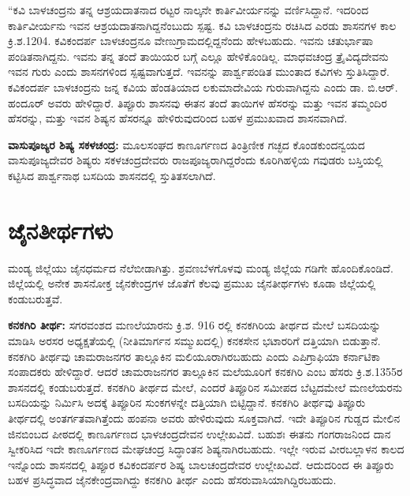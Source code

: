“ಕವಿ ಬಾಳಚಂದ್ರನು ತನ್ನ ಆಶ್ರಯದಾತನಾದ ರಟ್ಟರ ನಾಲ್ಕನೇ ಕಾರ್ತಿವೀರ್ಯನನ್ನು ವರ್ಣಿಸಿದ್ದಾನೆ. ಇದರಿಂದ ಕಾರ್ತಿವೀರ್ಯನು ಇವನ ಆಶ್ರಯದಾತನಾಗಿದ್ದನೆಂಬುದು ಸ್ಪಷ್ಟ. ಕವಿ ಬಾಳಚಂದ್ರನು ರಚಿಸಿದ ಎರಡು ಶಾಸನಗಳ ಕಾಲ ಕ್ರಿ.ಶ.1204. ಕವಿಕಂದರ್ಪ ಬಾಳಚಂದ್ರನೂ ವೇಣುಗ್ರಾಮದಲ್ಲಿದ್ದನೆಂದು ಹೇಳಬಹುದು. ಇವನು ಚತುರ್ಭಾಷಾ ಪಂಡಿತನಾಗಿದ್ದನು. ಇವನು ತನ್ನ ತಂದೆ ತಾಯಿಯರ ಬಗ್ಗೆ ಎಲ್ಲೂ ಹೇಳಿಕೊಂಡಿಲ್ಲ. ಮಾಧವಚಂದ್ರ ತ್ರೈವಿದ್ಯದೇವನು ಇವನ ಗುರು ಎಂದು ಶಾಸನಗಳಿಂದ ಸ್ಪಷ್ಟವಾಗುತ್ತದೆ. ಇವನನ್ನು ಪಾರ್ಶ್ವಪಂಡಿತ ಮುಂತಾದ ಕವಿಗಳು ಸ್ತುತಿಸಿದ್ದಾರೆ. ಕವಿಕಂದರ್ಪ ಬಾಳಚಂದ್ರನು ಜನ್ನ ಕವಿಯ ಹೆಂಡತಿಯಾದ ಲಕುಮಾದೇವಿಯ ಗುರುವಾಗಿದ್ದನು ಎಂದು ಡಾ. ಬಿ.ಆರ್​. ಹಂದೂರ್​ ಅವರು ಹೇಳಿದ್ದಾರೆ. ತಿಪ್ಪೂರು ಶಾಸನವು ಈತನ ತಂದೆ ತಾಯಿಗಳ ಹೆಸರನ್ನು ಮತ್ತು ಇವನ ತಮ್ಮಂದಿರ ಹೆಸರನ್ನು, ಮತ್ತು ಇವನ ಶಿಷ್ಯನ ಹೆಸರನ್ನೂ ಹೇಳಿರುವುದರಿಂದ ಬಹಳ ಪ್ರಮುಖವಾದ ಶಾಸನವಾಗಿದೆ.

\textbf{ವಾಸುಪೂಜ್ಯರ ಶಿಷ್ಯ ಸಕಳಚಂದ್ರ:} ಮೂಲಸಂಘದ ಕಾಣೂರ್ಗಣದ ತಿಂತ್ರಿಣೀಕ ಗಚ್ಛದ ಕೊಂಡಕುಂದನ್ವಯದ ವಾಸುಪೂಜ್ಯದೇವರ ಶಿಷ್ಯರು ಸಕಳಚಂದ್ರದೇವರು ರಾಜಪೂಜ್ಯರಾಗಿದ್ದರೆಂದು ಕೂರಿಗಿಹಳ್ಳಿಯ ಗವುಡರು ಬಸ್ತಿಯಲ್ಲಿ ಕಟ್ಟಿಸಿದ ಪಾರ್ಶ್ವನಾಥ ಬಸದಿಯ ಶಾಸನದಲ್ಲಿ ಸ್ತುತಿತಸಲಾಗಿದೆ.


\section{ಜೈನತೀರ್ಥಗಳು}

ಮಂಡ್ಯ ಜಿಲ್ಲೆಯು ಜೈನಧರ್ಮದ ನೆಲೆಬೀಡಾಗಿತ್ತು. ಶ್ರವಣಬೆಳಗೊಳವು ಮಂಡ್ಯ ಜಿಲ್ಲೆಯ ಗಡಿಗೇ ಹೊಂದಿಕೊಂಡಿದೆ. ಜಿಲ್ಲೆಯಲ್ಲಿ ಅನೇಕ ಶಾಸನೋಕ್ತ ಜೈನಕೇಂದ್ರಗಳ ಜೊತೆಗೆ ಕೆಲವು ಪ್ರಮುಖ ಜೈನತೀರ್ಥಗಳು ಕೂಡಾ ಜಿಲ್ಲೆಯಲ್ಲಿ ಕಂಡುಬರುತ್ತವೆ. 

\textbf{ಕನಕಗಿರಿ ತೀರ್ಥ:} ಸಗರವಂಶದ ಮಣಲೆಯಾರನು ಕ್ರಿ.ಶ. 916 ರಲ್ಲಿ ಕನಕಗಿರಿಯ ತೀರ್ಥದ ಮೇಲೆ ಬಸದಿಯನ್ನು ಮಾಡಿಸಿ ಅರಸರ ಅಧ್ಯಕ್ಷತೆಯಲ್ಲಿ (ನೀತಿಮಾರ್ಗನ ಸಮ್ಮುಖದಲ್ಲಿ) ಕನಕಸೇನ ಭಟಾರರಿಗೆ ದತ್ತಿಯಾಗಿ ಬಿಡುತ್ತಾನೆ. ಕನಕಗಿರಿ ತೀರ್ಥವು ಚಾಮರಾಜನಗರ ತಾಲ್ಲೂಕಿನ ಮಲಿಯೂರಾಗಿರಬಹುದು ಎಂದು ಎಪಿಗ್ರಾಫಿಯಾ ಕರ್ನಾಟಿಕಾ ಸಂಪಾದಕರು ಹೇಳಿದ್ದಾರೆ. ಆದರೆ ಚಾಮರಾಜನಗರ ತಾಲ್ಲೂಕಿನ ಮಲೆಯೂರಿಗೆ ಕನಕಗಿರಿ ಎಂಬ ಹೆಸರು ಕ್ರಿ.ಶ.1355ರ ಶಾಸನದಲ್ಲಿ ಕಂಡುಬರುತ್ತದೆ. ಕನಕಗಿರಿ ತೀರ್ಥದ ಮೇಲೆ, ಎಂದರೆ ತಿಪ್ಪೂರಿನ ಸಮೀಪದ ಬೆಟ್ಟದಮೇಲೆ ಮಣಲೆಯರನು ಬಸದಿಯನ್ನು ನಿರ್ಮಿಸಿ ಅದಕ್ಕೆ ತಿಪ್ಪೂರಿನ ಸುಂಕಗಳನ್ನೇ ದತ್ತಿಯಾಗಿ ಬಿಟ್ಟಿದ್ದಾನೆ. ಕನಕಗಿರಿ ತೀರ್ಥವು ತಿಪ್ಪೂರು ತೀರ್ಥದಲ್ಲಿ ಅಂತರ್ಗತವಾಗಿತ್ತೆಂದು ಹಂಪನಾ ಅವರು ಹೇಳಿರುವುದು ಸೂಕ್ತವಾಗಿದೆ. ಇದೇ ತಿಪ್ಪೂರಿನ ಗುಡ್ಡದ ಮೇಲಿನ ಜಿನಬಿಂಬದ ಪೀಠದಲ್ಲಿ ಕಾಣೂರ್ಗಣದ ಭಾಳಚಂದ್ರದೇವನ ಉಲ್ಲೇಖವಿದೆ. ಬಹುಶಃ ಈತನು ಗಂಗರಾಜನಿಂದ ದಾನ ಸ್ವೀಕರಿಸಿದ ಇದೇ ಕಾಣೂರ್ಗಣದ ಮೇಘಚಂದ್ರ ಸಿದ್ಧಾಂತನ ಶಿಷ್ಯನಾಗಿರಬಹುದು. ಇಲ್ಲೇ ಇರುವ ವೀರಬಲ್ಲಾಳನ ಕಾಲದ ಇನ್ನೊಂದು ಶಾಸನದಲ್ಲಿ ತಿಪ್ಪೂರ ಕವಿಕಂದರ್ಪರ ಶಿಷ್ಯ ಬಾಲಚಂದ್ರದೇವರ ಉಲ್ಲೇಖವಿದೆ. ಆದುದರಿಂದ ಈ ತಿಪ್ಪೂರು ಬಹಳ ಪ್ರಸಿದ್ಧವಾದ ಜೈನಕೇಂದ್ರವಾಗಿದ್ದು ಕನಕಗಿರಿ ತೀರ್ಥ ಎಂದು ಹೆಸರುವಾಸಿಯಾಗಿದ್ದಿರಬಹುದು. 

